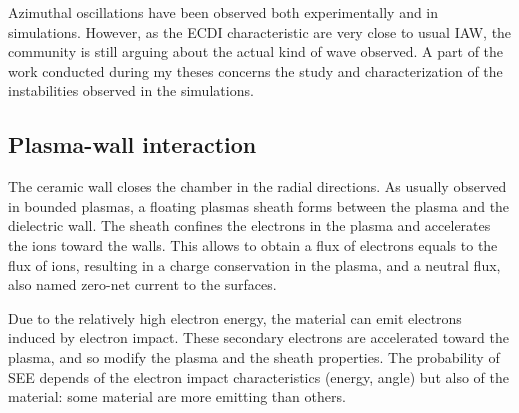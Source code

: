 Azimuthal oscillations have been observed both experimentally and in simulations.
However, as the \ac{ECDI} characteristic are very close to usual \ac{IAW}, the community is still arguing about the actual kind of wave observed.
A part of the work conducted during my theses concerns the study and characterization of the instabilities observed in the simulations.

\subsection{Plasma-wall interaction}
The ceramic wall closes the chamber in the radial directions.
As usually observed in bounded plasmas, a floating plasmas sheath forms between the plasma and the dielectric wall.
The sheath confines the electrons in the plasma and accelerates the ions toward the walls.
This allows to obtain a flux of electrons equals to the flux of ions, resulting in a charge conservation in the plasma, and a neutral flux, also named zero-net current to the surfaces.

Due to the relatively high electron energy, the material can emit electrons induced by electron impact.
These secondary electrons are accelerated toward the plasma, and so modify the plasma and the sheath properties.
The probability of \ac{SEE} depends of the electron impact characteristics (energy, angle) but also of the material\string: some material are more emitting than others.

